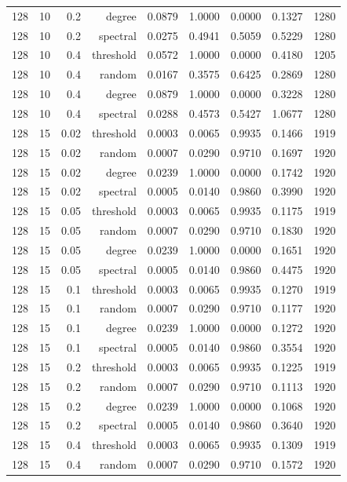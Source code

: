 \begin{table}[t]
\begin{tabular}{lrrrrrrrr}
128 & 10 & 0.2 & degree & 0.0879 & 1.0000 & 0.0000 & 0.1327 & 1280 \\
128 & 10 & 0.2 & spectral & 0.0275 & 0.4941 & 0.5059 & 0.5229 & 1280 \\
128 & 10 & 0.4 & threshold & 0.0572 & 1.0000 & 0.0000 & 0.4180 & 1205 \\
128 & 10 & 0.4 & random & 0.0167 & 0.3575 & 0.6425 & 0.2869 & 1280 \\
128 & 10 & 0.4 & degree & 0.0879 & 1.0000 & 0.0000 & 0.3228 & 1280 \\
128 & 10 & 0.4 & spectral & 0.0288 & 0.4573 & 0.5427 & 1.0677 & 1280 \\
128 & 15 & 0.02 & threshold & 0.0003 & 0.0065 & 0.9935 & 0.1466 & 1919 \\
128 & 15 & 0.02 & random & 0.0007 & 0.0290 & 0.9710 & 0.1697 & 1920 \\
128 & 15 & 0.02 & degree & 0.0239 & 1.0000 & 0.0000 & 0.1742 & 1920 \\
128 & 15 & 0.02 & spectral & 0.0005 & 0.0140 & 0.9860 & 0.3990 & 1920 \\
128 & 15 & 0.05 & threshold & 0.0003 & 0.0065 & 0.9935 & 0.1175 & 1919 \\
128 & 15 & 0.05 & random & 0.0007 & 0.0290 & 0.9710 & 0.1830 & 1920 \\
128 & 15 & 0.05 & degree & 0.0239 & 1.0000 & 0.0000 & 0.1651 & 1920 \\
128 & 15 & 0.05 & spectral & 0.0005 & 0.0140 & 0.9860 & 0.4475 & 1920 \\
128 & 15 & 0.1 & threshold & 0.0003 & 0.0065 & 0.9935 & 0.1270 & 1919 \\
128 & 15 & 0.1 & random & 0.0007 & 0.0290 & 0.9710 & 0.1177 & 1920 \\
128 & 15 & 0.1 & degree & 0.0239 & 1.0000 & 0.0000 & 0.1272 & 1920 \\
128 & 15 & 0.1 & spectral & 0.0005 & 0.0140 & 0.9860 & 0.3554 & 1920 \\
128 & 15 & 0.2 & threshold & 0.0003 & 0.0065 & 0.9935 & 0.1225 & 1919 \\
128 & 15 & 0.2 & random & 0.0007 & 0.0290 & 0.9710 & 0.1113 & 1920 \\
128 & 15 & 0.2 & degree & 0.0239 & 1.0000 & 0.0000 & 0.1068 & 1920 \\
128 & 15 & 0.2 & spectral & 0.0005 & 0.0140 & 0.9860 & 0.3640 & 1920 \\
128 & 15 & 0.4 & threshold & 0.0003 & 0.0065 & 0.9935 & 0.1309 & 1919 \\
128 & 15 & 0.4 & random & 0.0007 & 0.0290 & 0.9710 & 0.1572 & 1920 \\

\end{tabular}
\end{table}
